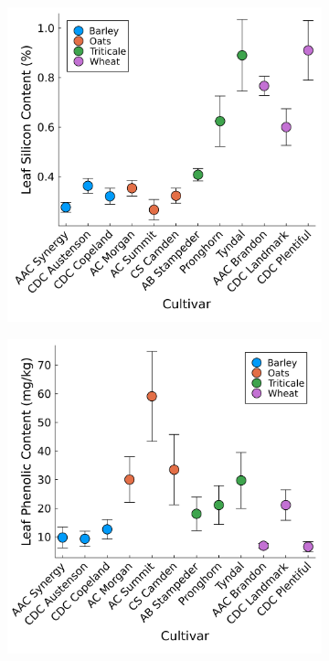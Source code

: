 \documentclass[12pt, letterpaper]{report}
\begin{document}
\begin{figure}[ht]
        \centering
        \begin{subfigure}[b]{0.65\textwidth}
                \centering
                \includegraphics[width = \textwidth]{images/spp_si_content.png}
        \end{subfigure}



        \begin{subfigure}[b]{0.65\textwidth}
                \centering
                \includegraphics[width = \textwidth]{images/spp_phenolic_content.png}
        \end{subfigure}
                

\end{figure}
\end{document}
